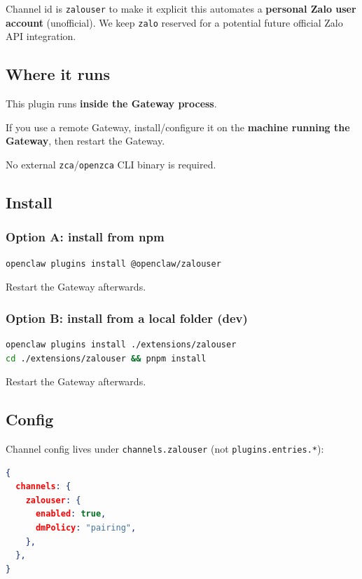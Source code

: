 Channel id is \texttt{zalouser} to make it explicit this automates a \textbf{personal Zalo user account} (unofficial). We keep \texttt{zalo} reserved for a potential future official Zalo API integration.

\subsection{Where it runs}


This plugin runs \textbf{inside the Gateway process}.

If you use a remote Gateway, install/configure it on the \textbf{machine running the Gateway}, then restart the Gateway.

No external \texttt{zca}/\texttt{openzca} CLI binary is required.

\subsection{Install}


\subsubsection{Option A: install from npm}


\begin{lstlisting}[language=bash]
openclaw plugins install @openclaw/zalouser
\end{lstlisting}


Restart the Gateway afterwards.

\subsubsection{Option B: install from a local folder (dev)}


\begin{lstlisting}[language=bash]
openclaw plugins install ./extensions/zalouser
cd ./extensions/zalouser && pnpm install
\end{lstlisting}


Restart the Gateway afterwards.

\subsection{Config}


Channel config lives under \texttt{channels.zalouser} (not \texttt{plugins.entries.*}):

\begin{lstlisting}[language=json]
{
  channels: {
    zalouser: {
      enabled: true,
      dmPolicy: "pairing",
    },
  },
}
\end{lstlisting}


